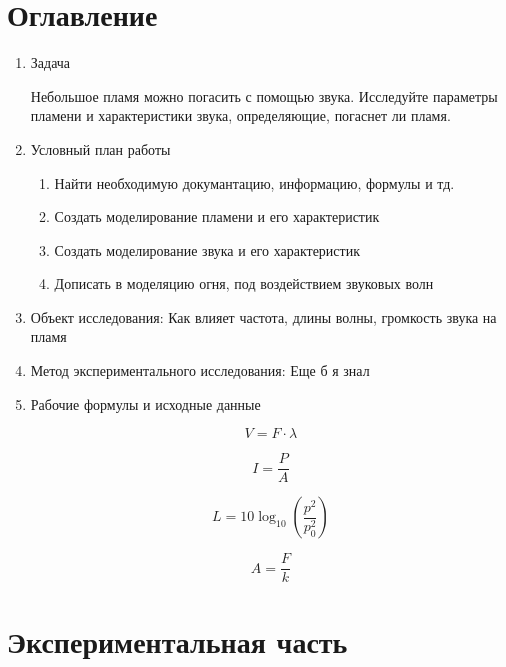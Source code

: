 \documentclass[a4paper,11pt]{article}
\begin{document}
\section{Оглавление}
\begin{enumerate}
	\item Задача 
	
	Небольшое пламя можно погасить с помощью звука.
    Исследуйте параметры пламени и характеристики звука, определяющие, погаснет ли пламя.

	\item Условный план работы 
	\begin{enumerate}
		\item Найти необходимую докумантацию, информацию, формулы и тд.
		\item Создать моделирование пламени и его характеристик 
		\item Создать моделирование звука и его характеристик
		\item Дописать в моделяцию огня, под воздействием звуковых волн 
	\end{enumerate}
	\item Объект исследования:
        Как влияет частота, длины волны, громкость звука на пламя
	\item Метод экспериментального исследования:
        Еще б я знал 
	\item Рабочие формулы и исходные данные
	
	\begin{multicols}{2}

   \begin{equation}\label{eq:i1} 
     V = F \cdot \lambda
   \end{equation}  
    
    \begin{equation}\label{eq:i2}  
        I=\frac{P}{A}
    \end{equation}    
    
    \begin{equation}  \label{eq:i3} 
       L = 10 \log_{10}(\frac{p^2}{p^2_0})
    \end{equation} 
    
    \begin{equation}  \label{eq:i4} 
       A=\frac{F}{k}
    \end{equation} 
    \end{multicols}
        
    \end{enumerate}

\section{Экспериментальная часть}
\end{document}
